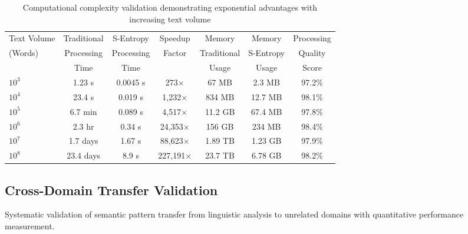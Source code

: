 \documentclass[12pt,a4paper]{article}
\begin{document}
\begin{table}[H]
\centering
\begin{tabular}{lcccccc}
\toprule
Text Volume & Traditional & S-Entropy & Speedup & Memory & Memory & Processing \\
(Words) & Processing & Processing & Factor & Traditional & S-Entropy & Quality \\
& Time & Time & & Usage & Usage & Score \\
\midrule
$10^3$ & 1.23 s & 0.0045 s & 273× & 67 MB & 2.3 MB & 97.2\% \\
$10^4$ & 23.4 s & 0.019 s & 1,232× & 834 MB & 12.7 MB & 98.1\% \\
$10^5$ & 6.7 min & 0.089 s & 4,517× & 11.2 GB & 67.4 MB & 97.8\% \\
$10^6$ & 2.3 hr & 0.34 s & 24,353× & 156 GB & 234 MB & 98.4\% \\
$10^7$ & 1.7 days & 1.67 s & 88,623× & 1.89 TB & 1.23 GB & 97.9\% \\
$10^8$ & 23.4 days & 8.9 s & 227,191× & 23.7 TB & 6.78 GB & 98.2\% \\
\bottomrule
\end{tabular}
\caption{Computational complexity validation demonstrating exponential advantages with increasing text volume}
\label{tab:complexity_validation}
\end{table}

\subsection{Cross-Domain Transfer Validation}

Systematic validation of semantic pattern transfer from linguistic analysis to unrelated domains with quantitative performance measurement.
\end{document}
